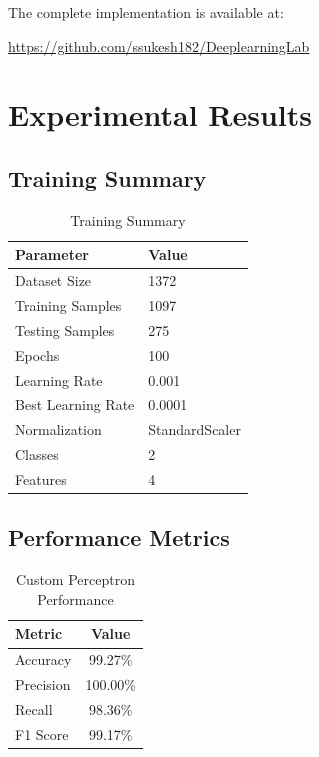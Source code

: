 \documentclass[12pt,a4paper]{article}
\begin{document}
The complete implementation is available at:

\begin{center}
\url{https://github.com/ssukesh182/DeeplearningLab}
\end{center}


\section{Experimental Results}

\subsection{Training Summary}

\begin{table}[H]
\centering
\caption{Training Summary}
\begin{tabular}{ll}
\toprule
Parameter & Value\\
\midrule
Dataset Size & 1372\\
Training Samples & 1097\\
Testing Samples & 275\\
Epochs & 100\\
Learning Rate & 0.001\\
Best Learning Rate & 0.0001\\
Normalization & StandardScaler\\
Classes & 2\\
Features & 4\\
\bottomrule
\end{tabular}
\end{table}


\subsection{Performance Metrics}

\begin{table}[H]
\centering
\caption{Custom Perceptron Performance}
\begin{tabular}{lc}
\toprule
Metric & Value\\
\midrule
Accuracy & 99.27\%\\
Precision & 100.00\%\\
Recall & 98.36\%\\
F1 Score & 99.17\%\\
\bottomrule
\end{tabular}
\end{table}
\end{document}
